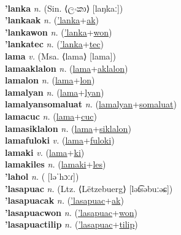  \label{lanaukiles} \\
\textbf{'lanka} \textit{n.} (Sin. ⟨ලංකා⟩ [laŋkaː])
 \label{'lanka} \\
\textbf{'lankaak} \textit{n.} (\hyperref['lanka]{'lanka}+\hyperref[ak]{ak})
 \label{'lankaak} \\
\textbf{'lankawon} \textit{n.} (\hyperref['lanka]{'lanka}+\hyperref[won]{won})
 \label{'lankawon} \\
\textbf{'lankatec} \textit{n.} (\hyperref['lanka]{'lanka}+\hyperref[tec]{tec})
 \label{'lankatec} \\
\textbf{lama} \textit{v.} (Msa. ⟨lama⟩ [lama])
 \label{lama} \\
\textbf{lamaaklalon} \textit{n.} (\hyperref[lama]{lama}+\hyperref[aklalon]{aklalon})
 \label{lamaaklalon} \\
\textbf{lamalon} \textit{n.} (\hyperref[lama]{lama}+\hyperref[lon]{lon})
 \label{lamalon} \\
\textbf{lamalyan} \textit{n.} (\hyperref[lama]{lama}+\hyperref[lyan]{lyan})
 \label{lamalyan} \\
\textbf{lamalyansomaluat} \textit{n.} (\hyperref[lamalyan]{lamalyan}+\hyperref[somaluat]{somaluat})
 \label{lamalyansomaluat} \\
\textbf{lamacuc} \textit{n.} (\hyperref[lama]{lama}+\hyperref[cuc]{cuc})
 \label{lamacuc} \\
\textbf{lamasiklalon} \textit{n.} (\hyperref[lama]{lama}+\hyperref[siklalon]{siklalon})
 \label{lamasiklalon} \\
\textbf{lamafuloki} \textit{v.} (\hyperref[lama]{lama}+\hyperref[fuloki]{fuloki})
 \label{lamafuloki} \\
\textbf{lamaki} \textit{v.} (\hyperref[lama]{lama}+\hyperref[ki]{ki})
 \label{lamaki} \\
\textbf{lamakiles} \textit{n.} (\hyperref[lamaki]{lamaki}+\hyperref[les]{les})
 \label{lamakiles} \\
\textbf{'lahol} \textit{n.} ( [ləˈhɔːɾ])
 \label{'lahol} \\
\textbf{'lasapuac} \textit{n.} (Ltz. ⟨Lëtzebuerg⟩ [lət͡səbuːəɕ])
 \label{'lasapuac} \\
\textbf{'lasapuacak} \textit{n.} (\hyperref['lasapuac]{'lasapuac}+\hyperref[ak]{ak})
 \label{'lasapuacak} \\
\textbf{'lasapuacwon} \textit{n.} (\hyperref['lasapuac]{'lasapuac}+\hyperref[won]{won})
 \label{'lasapuacwon} \\
\textbf{'lasapuactilip} \textit{n.} (\hyperref['lasapuac]{'lasapuac}+\hyperref[tilip]{tilip})
